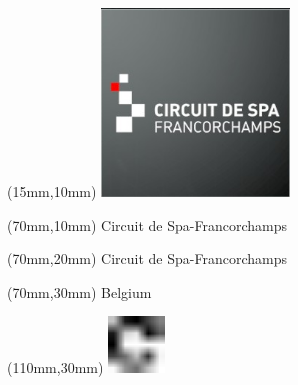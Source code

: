 \null\newpage
\begin{textblock*}{50mm}(15mm,10mm)%
\includegraphics[width=50mm]{LG/2015-05-20_00079.png}
\end{textblock*}
\begin{textblock*}{130mm}(70mm,10mm)%
{\fontsize{20}{20}\selectfont Circuit de Spa-Francorchamps}\\
\end{textblock*}
\begin{textblock*}{120mm}(70mm,20mm)%
{\fontsize{16}{16}\selectfont Circuit de Spa-Francorchamps}\\
\end{textblock*}
\begin{textblock*}{120mm}(70mm,30mm)%
{\fontsize{12}{12}\selectfont Belgium}
\end{textblock*}
\begin{textblock*}{30mm}(110mm,30mm)%
\centering
\includegraphics[height=15mm]{icons/fa-rotate-right.pdf}
\end{textblock*}
